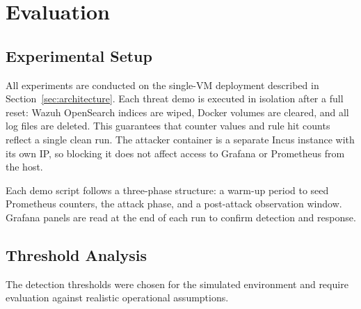 \section{Evaluation}
\label{sec:evaluation}

\subsection{Experimental Setup}

All experiments are conducted on the single-VM deployment described in
Section~\ref{sec:architecture}. Each threat demo is executed in isolation after
a full reset: Wazuh OpenSearch indices are wiped, Docker volumes are cleared, and
all log files are deleted. This guarantees that counter values and rule hit counts
reflect a single clean run. The attacker container is a separate Incus instance
with its own IP, so blocking it does not affect access to Grafana or Prometheus
from the host.

Each demo script follows a three-phase structure: a warm-up period to seed
Prometheus counters, the attack phase, and a post-attack observation window.
Grafana panels are read at the end of each run to confirm detection and response.

\subsection{Threshold Analysis}

The detection thresholds were chosen for the simulated environment and require
evaluation against realistic operational assumptions.

